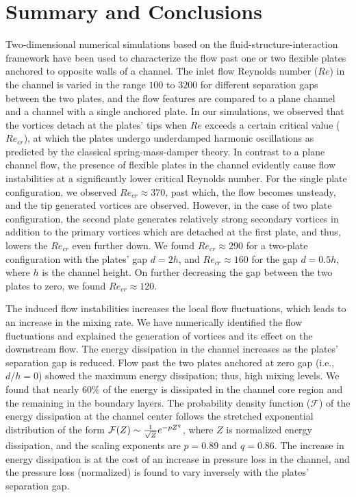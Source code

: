 \documentclass[aps,pre,twocolumn,aps,longbibliography]{revtex4-1}
\begin{document}
	\section{Summary and Conclusions}
	
	Two-dimensional numerical simulations based on the fluid-structure-interaction framework have been used to characterize the flow past one or two flexible plates anchored to opposite walls of a channel. The inlet flow Reynolds number ($Re$) in the channel is varied in the range $100$ to $3200$ for different separation gaps between the two plates, and the flow features are compared to a plane channel and a channel with a single anchored plate. In our simulations, we observed that the vortices detach at the plates' tips when $Re$ exceeds a certain critical value ($Re_{cr}$), at which the plates undergo underdamped harmonic oscillations as predicted by the classical spring-mass-damper theory. In contrast to a plane channel flow, the presence of flexible plates in the channel evidently cause flow instabilities at a significantly lower critical Reynolds number. For the single plate configuration, we observed $Re_{cr}\approx 370$, past which, the flow becomes unsteady, and the tip generated vortices are observed. However, in the case of two plate configuration, the second plate generates relatively strong secondary vortices in addition to the primary vortices which are detached at the first plate, and thus, lowers the $Re_{cr}$ even further down. We found $Re_{cr}\approx 290$ for a two-plate configuration with the plates' gap $d=2h$, and $Re_{cr}\approx 160$ for the gap $d=0.5h$, where $h$ is the channel height. On further decreasing the gap between the two plates to zero, we found $Re_{cr}\approx 120$.
	
	The induced flow instabilities increases the local flow fluctuations, which leads to an increase in the mixing rate. We have numerically identified the flow fluctuations and explained the generation of vortices and its effect on the downstream flow. The energy dissipation in the channel increases as the plates' separation gap is reduced. Flow past the two plates anchored at zero gap (i.e., $d/h=0$) showed the maximum energy dissipation; thus, high mixing levels. We found that nearly 60\% of the energy is dissipated in the channel core region and the remaining in the boundary layers. The probability density function ($\mathcal{F}$) of the energy dissipation at the channel center follows the stretched exponential distribution of the form $\mathcal{F}(Z)\sim{1\over{\sqrt{Z}}}e^{-pZ^{q}}$, where $Z$ is normalized energy dissipation, and the scaling exponents are $p=0.89$ and $q=0.86$. The increase in energy dissipation is at the cost of an increase in pressure loss in the channel, and the pressure loss (normalized) is found to vary inversely with the plates' separation gap. 
	
\end{document}

